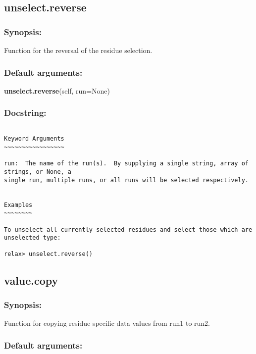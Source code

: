 \newpage

\subsection{unselect.reverse}


\subsubsection{Synopsis:}

Function for the reversal of the residue selection.

\subsubsection{Default arguments:}

\textsf{\textbf{unselect.reverse}(self, run=None)
}


\subsubsection{Docstring:}

{\scriptsize
\begin{verbatim}

Keyword Arguments
~~~~~~~~~~~~~~~~~

run:  The name of the run(s).  By supplying a single string, array of strings, or None, a
single run, multiple runs, or all runs will be selected respectively.


Examples
~~~~~~~~

To unselect all currently selected residues and select those which are unselected type:

relax> unselect.reverse()
\end{verbatim}
}



\newpage

\subsection{value.copy}


\subsubsection{Synopsis:}

Function for copying residue specific data values from run1 to run2.

\subsubsection{Default arguments:}

